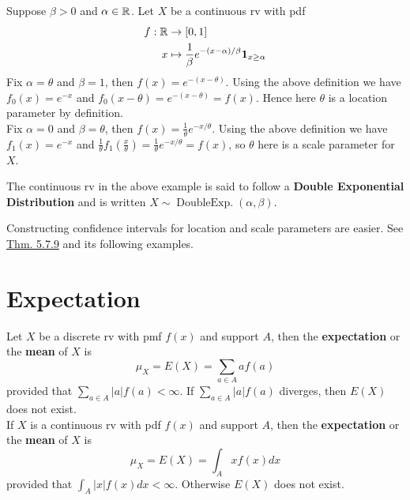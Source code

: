 \documentclass[11pt,fleqn]{book} %
\begin{document}
\begin{example} Suppose \(\beta > 0\) and \(\alpha \in \mathbb{R}\). Let \(X\) be a continuous rv with pdf
\[
\begin{aligned}
f: \mathbb{R} &\rightarrow [0, 1] \\
x &\mapsto \frac1\beta e^{-(x - \alpha) / \beta}\mathbf{1}_{x \geq \alpha}
\end{aligned}
\]
\indent Fix \(\alpha = \theta\) and \(\beta = 1\), then \(f(x) = e^{-(x - \theta)}\). Using the above definition we have \(f_0(x) = e^{-x}\) and \(f_0(x - \theta) = e^{-(x - \theta)} = f(x)\). Hence here \(\theta\) is a location parameter by definition.\\
\indent Fix \(\alpha = 0\) and \(\beta = \theta\), then \(f(x) = \frac1\theta e^{-x/\theta}\). Using the above definition we have \(f_1(x) = e^{-x}\) and \(\frac1\theta f_1\left(\frac x \theta\right) = \frac1\theta e^{-x / \theta} = f(x)\), so \(\theta\) here is a scale parameter for \(X\).
\end{example}

\begin{remark}
The continuous rv in the above example is said to follow a \textbf{Double Exponential Distribution} and is written \(X \sim \operatorname{Double Exp.}(\alpha, \beta)\).
\end{remark}

\begin{remark}
Constructing confidence intervals for location and scale parameters are easier. See \hyperref[thm:579]{Thm. 5.7.9} and its following examples.
\end{remark}


\section{Expectation}

\begin{definition} 
Let \(X\) be a discrete rv with pmf \(f(x)\) and support \(A\), then the \textbf{expectation} or the \textbf{mean} of \(X\) is
\[
\mu_X = E(X) = \sum_{a \in A} af(a)
\]
provided that \(\sum_{a \in A}|a|f(a) < \infty\). If \(\sum_{a \in A}|a|f(a)\) diverges, then \(E(X)\) does not exist.\\
\indent If \(X\) is a continuous rv with pdf \(f(x)\) and support \(A\), then the \textbf{expectation} or the \textbf{mean} of \(X\) is
\[
\mu_X = E(X) = \int_A xf(x)dx
\]
provided that \(\int_A |x|f(x) dx < \infty\). Otherwise \(E(X)\) does not exist.
\end{definition}
\end{document}
